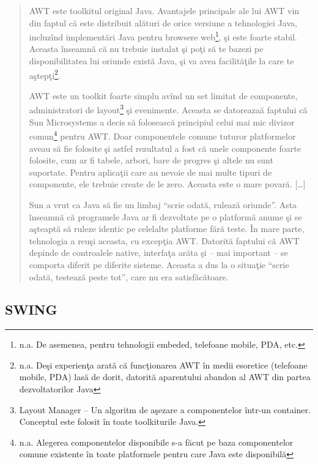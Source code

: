 \begin{quotation}
AWT este toolkitul original Java. Avantajele principale ale lui AWT vin din
faptul că este distribuit alături de orice versiune a tehnologiei Java,
incluzînd implementări Java pentru browsere web\footnote{n.a. De asemenea,
pentru tehnologii embeded, telefoane mobile, PDA, etc.}, şi este foarte stabil.
Aceasta înseamnă că nu trebuie instalat şi poţi să te bazezi pe disponibilitatea
lui oriunde există Java, şi va avea facilităţile la care te
aştepţi\footnote{n.a. Deşi experienţa arată că funcţionarea AWT în medii
esoretice (telefoane mobile, PDA) lasă de dorit, datorită aparentului abandon al
AWT din partea dezvoltatorilor Java}.

AWT este un toolkit foarte simplu avînd un set limitat de componente,
administratori de layout\footnote{Layout Manager -- Un algoritm de aşezare a
componentelor într-un container. Conceptul este folosit în toate toolkiturile
Java.} şi evenimente. Aceasta se datoreazaă faptului că Sun Microsystems a decis
să folosească principiul celui mai mic divizor comun\footnote{n.a. Alegerea
componentelor disponibile s-a făcut pe baza componentelor comune existente în
toate platformele pentru care Java este disponibilă} pentru AWT. Doar
componentele comune tuturor platformelor aveau să fie folosite şi astfel
rezultatul a fost că unele componente foarte folosite, cum ar fi tabele, arbori,
bare de progres şi altele nu sunt suportate. Pentru aplicaţii care au nevoie de
mai multe tipuri de componente, ele trebuie create de le zero. Aceasta este o
mare povară. [\ldots]

Sun a vrut ca Java să fie un limbaj ``scrie odată, rulează oriunde''. Asta
înseamnă că programele Java ar fi dezvoltate pe o platformă anume şi se aşteaptă
să ruleze identic pe celelalte platforme fără teste. În mare parte, tehnologia a
reuşi aceasta, cu excepţia AWT. Datorită faptului că AWT depinde de controalele
native, interfaţa arăta şi -- mai important -- se comporta diferit pe diferite
sisteme. Aceasta a dus la o situaţie ``scrie odată, testează peste tot'', care
nu era satisfăcătoare.
\cite{swtawtswing}
\end{quotation}

\subsection{SWING}


